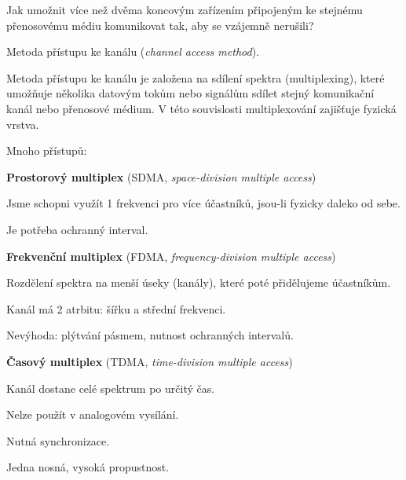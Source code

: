 \begin{compactitem}
    \item Jak umožnit více než dvěma koncovým zařízením připojeným ke stejnému přenosovému médiu komunikovat tak, aby se vzájemně nerušili? \begin{compactitem}
        \item Metoda přístupu ke kanálu (\textit{channel access method}).
    \end{compactitem}

    \item Metoda přístupu ke kanálu je založena na sdílení spektra (multiplexing), které umožňuje několika datovým tokům nebo signálům sdílet stejný komunikační kanál nebo přenosové médium. V této souvislosti multiplexování zajišťuje fyzická vrstva.

    \item Mnoho přístupů: \begin{compactenum}
        \item \textbf{Prostorový multiplex} (SDMA, \textit{space-division multiple access}) \begin{compactitem}
            \item Jsme schopni využít 1 frekvenci pro více účastníků, jsou-li fyzicky daleko od sebe.

            \item Je potřeba ochranný interval.
        \end{compactitem}

        \item \textbf{Frekvenční multiplex} (FDMA, \textit{frequency-division multiple access}) \begin{compactitem}
            \item Rozdělení spektra na menší úseky (kanály), které poté přidělujeme účastníkům.
            \item Kanál má 2 atrbitu: šířku a střední frekvenci.
            \item Nevýhoda: plýtvání pásmem, nutnost ochranných intervalů.
        \end{compactitem}

        \item \textbf{Časový multiplex} (TDMA, \textit{time-division multiple access}) \begin{compactitem}
            \item Kanál dostane celé spektrum po určitý čas.
            \item Nelze použít v analogovém vysílání.
            \item Nutná synchronizace.
            \item Jedna nosná, vysoká propustnost.
        \end{compactitem}


\end{compactenum}
\end{compactitem}
